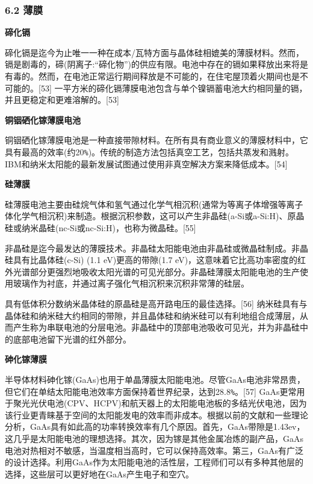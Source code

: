 \subsubsection{6.2 薄膜}



\textbf{碲化镉}

碲化镉是迄今为止唯一一种在成本/瓦特方面与晶体硅相媲美的薄膜材料。然而，镉是剧毒的，碲(阴离子:“碲化物”)的供应有限。电池中存在的镉如果释放出来将是有毒的。然而，在电池正常运行期间释放是不可能的，在住宅屋顶着火期间也是不可能的。[53] 一平方米的碲化镉薄膜电池包含与单个镍镉蓄电池大约相同量的镉，并且更稳定和更难溶解的。[53]

\textbf{铜铟硒化镓薄膜电池}

铜铟硒化镓薄膜电池是一种直接带隙材料。在所有具有商业意义的薄膜材料中，它具有最高的效率(约20\verb|%|)。传统的制造方法包括真空工艺，包括共蒸发和溅射。IBM和纳米太阳能的最新发展试图通过使用非真空解决方案来降低成本。[54]

\textbf{硅薄膜}

硅薄膜电池主要由硅烷气体和氢气通过化学气相沉积(通常为等离子体增强等离子体化学气相沉积)来制造。根据沉积参数，这可以产生非晶硅(a-Si或a-Si:H)、原晶硅或纳米晶硅(nc-Si或nc-Si:H)，也称为微晶硅。[55]

非晶硅是迄今最发达的薄膜技术。非晶硅太阳能电池由非晶硅或微晶硅制成。非晶硅具有比晶体硅(c-Si) (1.1 eV)更高的带隙(1.7 eV)，这意味着它比高功率密度的红外光谱部分更强烈地吸收太阳光谱的可见光部分。非晶硅薄膜太阳能电池的生产使用玻璃作为衬底，并通过离子强化气相沉积来沉积非常薄的硅层。

具有低体积分数纳米晶体硅的原晶硅是高开路电压的最佳选择。[56] 纳米硅具有与晶体硅和纳米硅大约相同的带隙，并且晶体硅和纳米硅可以有利地组合成薄层，从而产生称为串联电池的分层电池。非晶硅中的顶部电池吸收可见光，并为非晶硅中的底部电池留下光谱的红外部分。

\textbf{砷化镓薄膜}

半导体材料砷化镓(GaAs)也用于单晶薄膜太阳能电池。尽管GaAs电池非常昂贵，但它们在单结太阳能电池效率方面保持着世界纪录，达到28.8\verb|%|。[57] GaAs更常用于聚光光伏电池(CPV、HCPV)和航天器上的太阳能电池板的多结光伏电池，因为该行业更青睐基于空间的太阳能发电的效率而非成本。根据以前的文献和一些理论分析，GaAs具有如此高的功率转换效率有几个原因。首先，GaAs带隙是1.43ev，这几乎是太阳能电池的理想选择。其次，因为镓是其他金属冶炼的副产品，GaAs电池对热相对不敏感，当温度相当高时，它可以保持高效率。第三，GaAs有广泛的设计选择。利用GaAs作为太阳能电池的活性层，工程师们可以有多种其他层的选择，这些层可以更好地在GaAs产生电子和空穴。

